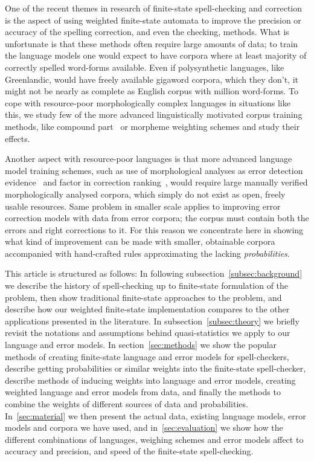 \documentclass[a4paper,12pt]{article}
\begin{document}
One of the recent themes in research of finite-state spell-checking and
correction is the aspect of using weighted finite-state automata to improve the
precision or accuracy of the spelling correction, and even the checking,
methods. What is unfortunate is that these methods often require large amounts
of data; to train the language models one would expect to have corpora where at
least majority of correctly spelled word-forms available. Even if polysynthetic
languages, like Greenlandic, would have freely available gigaword corpora,
which they don't, it might not be nearly as complete as English corpus with
million word-forms. To cope with resource-poor morphologically complex
languages in situations like this, we study few of the more advanced
linguistically motivated corpus training methods, like compound
part~\cite[]{pirinen/2009/nodalida} or morpheme weighting schemes and study
their effects.

Another aspect with resource-poor languages is that more advanced language
model training schemes, such as use of morphological analyses as error
detection evidence~\cite[]{mays/1991} and factor in correction
ranking~\cite[]{otero/2007}, would require large manually verified
morphologically analysed corpora, which simply do not exist as open, freely
usable resources. Same problem in smaller scale applies to improving error
correction models with data from error corpora; the corpus must contain both
the errors and right corrections to it. For this reason we concentrate here in
showing what kind of improvement can be made with smaller, obtainable corpora
accompanied with hand-crafted rules approximating the lacking
\emph{probabilities}.

This article is structured as follows: In following
subsection~\ref{subsec:background} we describe the history of spell-checking up
to finite-state formulation of the problem, then show traditional finite-state
approaches to the problem, and describe how our weighted finite-state
implementation compares to the other applications presented in the literature.
In subsection~\ref{subsec:theory} we briefly revisit the notations and
assumptions behind quasi-statistics we apply to our language and error models.
In section~\ref{sec:methods} we show the popular methods of creating
finite-state language and error models for spell-checkers, describe getting
probabilities or similar weights into the finite-state spell-checker, describe
methods of inducing weights into language and error models, creating weighted
language and error models from data, and finally the methods to combine the
weights of different sources of data and probabilities. In~\ref{sec:material}
we then present the actual data, existing language models, error models and
corpora we have used, and in~\ref{sec:evaluation} we show how the different
combinations of languages, weighing schemes and error models affect to accuracy
and precision, and speed of the finite-state spell-checking.
\end{document}

